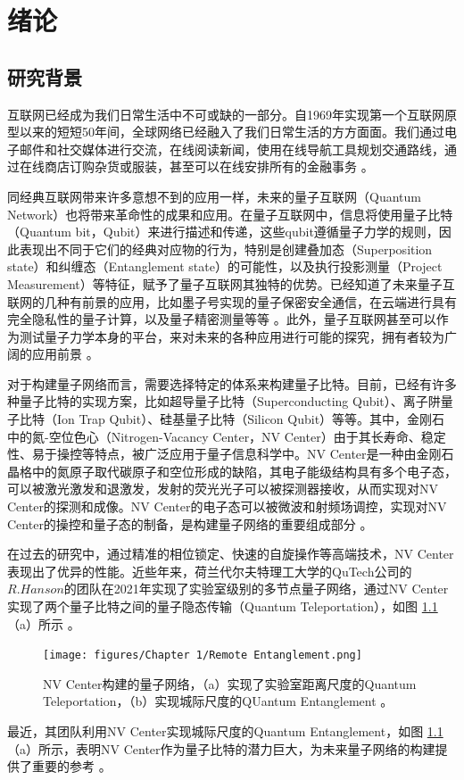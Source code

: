\documentclass[type = bachelor, oneside]{whu-thesis}
\begin{document}

\chapter{绪论}

\section{研究背景}
互联网已经成为我们日常生活中不可或缺的一部分。自1969年实现第一个互联网原型以来的短短50年间，全球网络已经融入了我们日常生活的方方面面。我们通过电子邮件和社交媒体进行交流，在线阅读新闻，使用在线导航工具规划交通路线，通过在线商店订购杂货或服装，甚至可以在线安排所有的金融事务 \cite{Internet2024Wiley}。

同经典互联网带来许多意想不到的应用一样，未来的量子互联网（Quantum Network）也将带来革命性的成果和应用。在量子互联网中，信息将使用量子比特（Quantum bit，Qubit）来进行描述和传递，这些qubit遵循量子力学的规则，因此表现出不同于它们的经典对应物的行为，特别是创建叠加态（Superposition state）和纠缠态（Entanglement state）的可能性，以及执行投影测量（Project Measurement）等特征，赋予了量子互联网其独特的优势。已经知道了未来量子互联网的几种有前景的应用，比如墨子号实现的量子保密安全通信，在云端进行具有完全隐私性的量子计算，以及量子精密测量等等 \cite{Ekert2014,Jiang2007,Broadbent2009,Gottesman2012,Nickerson2014,Komar2014}。此外，量子互联网甚至可以作为测试量子力学本身的平台，来对未来的各种应用进行可能的探究，拥有者较为广阔的应用前景 \cite{Hensen2015, Wehner2018}。

对于构建量子网络而言，需要选择特定的体系来构建量子比特。目前，已经有许多种量子比特的实现方案，比如超导量子比特（Superconducting Qubit）、离子阱量子比特（Ion Trap Qubit）、硅基量子比特（Silicon Qubit）等等。其中，金刚石中的氮-空位色心（Nitrogen-Vacancy Center，NV Center）由于其长寿命、稳定性、易于操控等特点，被广泛应用于量子信息科学中。NV Center是一种由金刚石晶格中的氮原子取代碳原子和空位形成的缺陷，其电子能级结构具有多个电子态，可以被激光激发和退激发，发射的荧光光子可以被探测器接收，从而实现对NV Center的探测和成像。NV Center的电子态可以被微波和射频场调控，实现对NV Center的操控和量子态的制备，是构建量子网络的重要组成部分 \cite{Doherty2013,Childress2014}。

在过去的研究中，通过精准的相位锁定、快速的自旋操作等高端技术，NV Center表现出了优异的性能。近些年来，荷兰代尔夫特理工大学的QuTech公司的$R.Hanson$的团队在2021年实现了实验室级别的多节点量子网络，通过NV Center实现了两个量子比特之间的量子隐态传输（Quantum Teleportation），如图 \ref{fig: Remote Entanglement}（a）所示 \cite{Pompili2021}。
\begin{figure}
  \centering
  \texttt{[image: figures/Chapter 1/Remote Entanglement.png]}
  \caption[NV Center构建的量子网络]{NV Center构建的量子网络，（a）实现了实验室距离尺度的Quantum Teleportation，（b）实现城际尺度的QUantum Entanglement \cite{Pompili2021,Stolk2024}。}
  \label{fig: Remote Entanglement}
\end{figure}
最近，其团队利用NV Center实现城际尺度的Quantum Entanglement，如图 \ref{fig: Remote Entanglement}（a）所示，表明NV Center作为量子比特的潜力巨大，为未来量子网络的构建提供了重要的参考 \cite{Stolk2024}。
\end{document}
